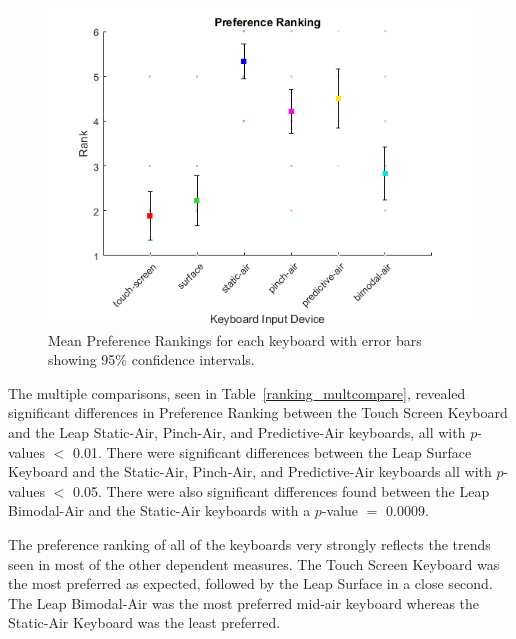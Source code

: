 \begin{figure}[h]
	\centering
	\includegraphics{fig_ranking_mean}
	\caption[Mean Preference Rankings]{Mean Preference Rankings for each keyboard with error bars showing 95\% confidence intervals.}
	\label{fig_ranking_mean}
\end{figure}

The multiple comparisons, seen in Table~\ref{ranking_multcompare}, revealed significant differences in Preference Ranking between the Touch Screen Keyboard and the Leap Static-Air, Pinch-Air, and Predictive-Air keyboards, all with $p$-values $<$ 0.01. There were significant differences between the Leap Surface Keyboard and the Static-Air, Pinch-Air, and Predictive-Air keyboards all with $p$-values $<$ 0.05. There were also significant differences found between the Leap Bimodal-Air and the Static-Air keyboards with a $p$-value $=$ 0.0009.

The preference ranking of all of the keyboards very strongly reflects the trends seen in most of the other dependent measures. The Touch Screen Keyboard was the most preferred as expected, followed by the Leap Surface in a close second. The Leap Bimodal-Air was the most preferred mid-air keyboard whereas the Static-Air Keyboard was the least preferred.